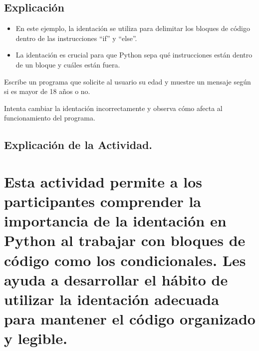 \documentclass[
  a4paper,
  DIV=11,
  numbers=noendperiod,
  onepage,
  openany]{scrreprt}
\providecommand{\tightlist}{%
  \setlength{\itemsep}{0pt}\setlength{\parskip}{0pt}}\usepackage{longtable,booktabs,array}
\begin{document}
\hypertarget{explicaciuxf3n-6}{%
\section{Explicación}\label{explicaciuxf3n-6}}

\begin{itemize}
\tightlist
\item
  En este ejemplo, la identación se utiliza para delimitar los bloques
  de código dentro de las instrucciones ``if'' y ``else''.
\item
  La identación es crucial para que Python sepa qué instrucciones están
  dentro de un bloque y cuáles están fuera.
\end{itemize}

\begin{tcolorbox}[enhanced jigsaw, colbacktitle=quarto-callout-important-color!10!white, toprule=.15mm, leftrule=.75mm, titlerule=0mm, opacityback=0, rightrule=.15mm, opacitybacktitle=0.6, breakable, left=2mm, coltitle=black, title=\textcolor{quarto-callout-important-color}{\faExclamation}\hspace{0.5em}{Actividad Práctica:}, toptitle=1mm, bottomtitle=1mm, arc=.35mm, bottomrule=.15mm, colback=white, colframe=quarto-callout-important-color-frame]

Escribe un programa que solicite al usuario su edad y muestre un mensaje
según si es mayor de 18 años o no.

Intenta cambiar la identación incorrectamente y observa cómo afecta al
funcionamiento del programa.

\end{tcolorbox}

\hypertarget{explicaciuxf3n-de-la-actividad.}{%
\section{Explicación de la
Actividad.}\label{explicaciuxf3n-de-la-actividad.}}

\hypertarget{esta-actividad-permite-a-los-participantes-comprender-la-importancia-de-la-identaciuxf3n-en-python-al-trabajar-con-bloques-de-cuxf3digo-como-los-condicionales.-les-ayuda-a-desarrollar-el-huxe1bito-de-utilizar-la-identaciuxf3n-adecuada-para-mantener-el-cuxf3digo-organizado-y-legible.}{%
\chapter{Esta actividad permite a los participantes comprender la
importancia de la identación en Python al trabajar con bloques de código
como los condicionales. Les ayuda a desarrollar el hábito de utilizar la
identación adecuada para mantener el código organizado y
legible.}\label{esta-actividad-permite-a-los-participantes-comprender-la-importancia-de-la-identaciuxf3n-en-python-al-trabajar-con-bloques-de-cuxf3digo-como-los-condicionales.-les-ayuda-a-desarrollar-el-huxe1bito-de-utilizar-la-identaciuxf3n-adecuada-para-mantener-el-cuxf3digo-organizado-y-legible.}}
\end{document}

